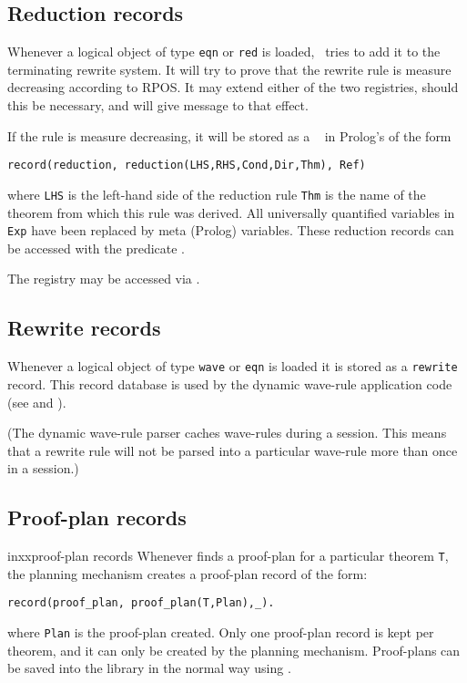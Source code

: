 \subsection {Reduction records}
\label{reduction-records}
Whenever a logical object of type {\tt eqn} or {\tt red} is loaded,
\clam\ tries to add it to the terminating rewrite system.  It will try
to prove that the rewrite rule is measure decreasing according to \inx
{RPOS}.  It may extend either of the two
registries, should this be necessary, and will give message to that
effect.

        If the rule is measure decreasing, it will be stored as a {\tt
{}} in Prolog's  of the form
\begin{verbatim}
record(reduction, reduction(LHS,RHS,Cond,Dir,Thm), Ref)
\end{verbatim}
where {\tt LHS} is the left-hand side of the reduction rule {\tt Thm}
is the name of the theorem from which this rule was derived. All
universally quantified variables in {\tt Exp} have been replaced by
meta (Prolog) variables. These reduction records can be accessed with
the predicate .

The registry may be accessed via .


\subsection {Rewrite records}
\label{rewrite-records}
Whenever a logical object of type {\tt wave} or {\tt eqn} is loaded it
is stored as a {\tt rewrite} record.  This record database is used by
the dynamic wave-rule application code (see  and ).  

(The dynamic wave-rule parser caches wave-rules during a session.  This
means that a rewrite rule will not be parsed into a particular
wave-rule more than once in a session.)


\subsection {Proof-plan records}
inxx{proof-plan records} Whenever \clam{} finds a proof-plan for a
particular theorem {\tt T}, the planning mechanism creates a
proof-plan record of the form:
\begin{verbatim}
record(proof_plan, proof_plan(T,Plan),_).
\end{verbatim}
where {\tt Plan} is the proof-plan created.  Only one proof-plan
record is kept per theorem, and it can only be created by the
planning mechanism.  Proof-plans can be saved into the library in the
normal way using .

